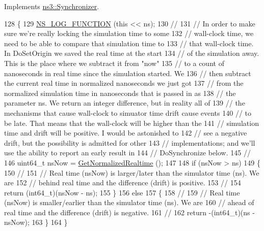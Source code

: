 Implements \hyperlink{classns3_1_1Synchronizer_a932323ccabc78704ecf4f9846863b5d8}{ns3\+::\+Synchronizer}.


\begin{DoxyCode}
128 \{
129   \hyperlink{log-macros-disabled_8h_a90b90d5bad1f39cb1b64923ea94c0761}{NS\_LOG\_FUNCTION} (\textcolor{keyword}{this} << ns);
130 \textcolor{comment}{//}
131 \textcolor{comment}{// In order to make sure we're really locking the simulation time to some }
132 \textcolor{comment}{// wall-clock time, we need to be able to compare that simulation time to}
133 \textcolor{comment}{// that wall-clock time.  In DoSetOrigin we saved the real time at the start}
134 \textcolor{comment}{// of the simulation away.  This is the place where we subtract it from "now"}
135 \textcolor{comment}{// to a count of nanoseconds in real time since the simulation started.  We}
136 \textcolor{comment}{// then subtract the current real time in normalized nanoseconds we just got}
137 \textcolor{comment}{// from the normalized simulation time in nanoseconds that is passed in as}
138 \textcolor{comment}{// the parameter ns.  We return an integer difference, but in reality all of}
139 \textcolor{comment}{// the mechanisms that cause wall-clock to simuator time drift cause events}
140 \textcolor{comment}{// to be late.  That means that the wall-clock will be higher than the }
141 \textcolor{comment}{// simulation time and drift will be positive.  I would be astonished to }
142 \textcolor{comment}{// see a negative drift, but the possibility is admitted for other }
143 \textcolor{comment}{// implementations; and we'll use the ability to report an early result in}
144 \textcolor{comment}{// DoSynchronize below.}
145 \textcolor{comment}{//}
146   uint64\_t nsNow = \hyperlink{classns3_1_1WallClockSynchronizer_a1a9757f294c7677e211b19ef10867780}{GetNormalizedRealtime} ();
147 
148   \textcolor{keywordflow}{if} (nsNow > ns)
149     \{
150 \textcolor{comment}{//}
151 \textcolor{comment}{// Real time (nsNow) is larger/later than the simulator time (ns).  We are}
152 \textcolor{comment}{// behind real time and the difference (drift) is positive.}
153 \textcolor{comment}{//}
154       \textcolor{keywordflow}{return} (int64\_t)(nsNow - ns);
155     \}
156   \textcolor{keywordflow}{else}
157     \{
158 \textcolor{comment}{// }
159 \textcolor{comment}{// Real time (nsNow) is smaller/earlier than the simulator time (ns).  We are}
160 \textcolor{comment}{// ahead of real time and the difference (drift) is negative.}
161 \textcolor{comment}{//}
162       \textcolor{keywordflow}{return} -(int64\_t)(ns - nsNow);
163     \}
164 \}
\end{DoxyCode}


